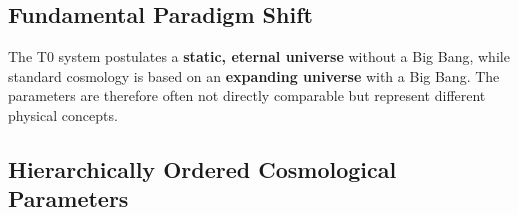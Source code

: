 \subsection{Fundamental Paradigm Shift}
\label{subsec:paradigm_shift}

\begin{tcolorbox}[colback=red!5!white,colframe=red!75!black,title=Warning: Fundamental Differences]
	The T0 system postulates a \textbf{static, eternal universe} without a Big Bang, while standard cosmology is based on an \textbf{expanding universe} with a Big Bang. The parameters are therefore often not directly comparable but represent different physical concepts.
\end{tcolorbox}

\subsection{Hierarchically Ordered Cosmological Parameters}
\label{subsec:cosmic_hierarchical_mapping}

